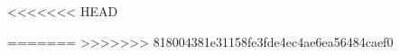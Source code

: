\documentclass[11pt]{report}
\begin{document}
<<<<<<< HEAD
    
=======
>>>>>>> 818004381e31158fe3fde4ec4ae6ea56484caef0
    
    
    
    
    
    
    
    
    
    
    
    
    \newpage
    
    
    
\end{document}
